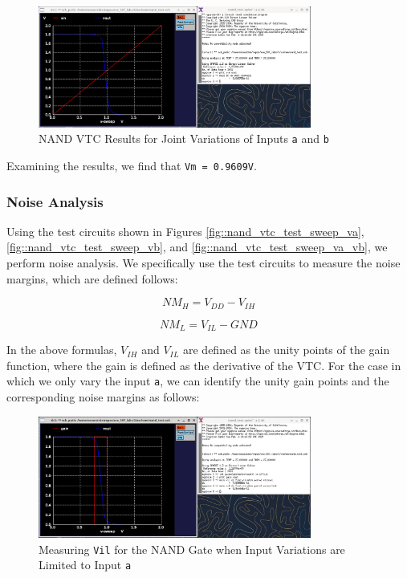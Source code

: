 \documentclass[fleqn]{article}
\begin{document}
	\begin{figure}[H]
		\centerline{\includegraphics[width=0.8\textwidth]{nand_vtc_sweep_va_vb.png}}
		\caption{NAND VTC Results for Joint Variations of Inputs \texttt{a} and \texttt{b}}
		\label{fig::nand_vtc_sweep_va_vb}
	\end{figure}
	
	Examining the results, we find that \texttt{Vm = 0.9609V}.
	
	\subsubsection{Noise Analysis}
	
	Using the test circuits shown in Figures \ref{fig::nand_vtc_test_sweep_va}, \ref{fig::nand_vtc_test_sweep_vb}, and \ref{fig::nand_vtc_test_sweep_va_vb}, we perform noise analysis. We specifically use the test circuits to measure the noise margins, which are defined follows:
	
	\begin{equation}
		NM_H = V_{DD} - V_{IH}
	\end{equation}
	
	\begin{equation}
		NM_L = V_{IL} - GND
	\end{equation}
	
	In the above formulas, $V_{IH}$ and $V_{IL}$ are defined as the unity points of the gain function, where the gain is defined as the derivative of the VTC. For the case in which we only vary the input \texttt{a}, we can identify the unity gain points and the corresponding noise margins as follows:
	
	\begin{figure}[H]
		\centerline{\includegraphics[width=0.8\textwidth]{nand_noise_analysis_sweep_va.png}}
		\caption{Measuring \texttt{Vil} for the NAND Gate when Input Variations are Limited to Input \texttt{a}}
		\label{fig::nand_noise_analysis_sweep_va}
	\end{figure}
	
\end{document}
